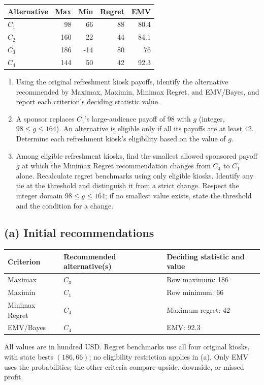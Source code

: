 \begin{center}\small\setlength{\tabcolsep}{4pt}
	\begin{tabular}{lrrrr}\toprule
		Alternative & Max & Min & Regret & EMV\\ \midrule
				$C_1$ & 98 & 66 & 88 & 80.4\\
		$C_2$ & 160 & 22 & 44 & 84.1\\
		$C_3$ & 186 & -14 & 80 & 76\\
		$C_4$ & 144 & 50 & 42 & 92.3\\
		\bottomrule
	\end{tabular}
\end{center}

\begin{enumerate}[label=\textbf{(\alph*)},leftmargin=*]
	\item Using the original refreshment kiosk payoffs, identify the alternative recommended by Maximax, Maximin, Minimax Regret, and EMV/Bayes, and report each criterion's deciding statistic value. 

	\item A sponsor replaces $C_1$'s large-audience payoff of 98 with $g$ (integer, $98\leq g\leq164$). An alternative is eligible only if all its payoffs are at least 42. Determine each refreshment kiosk's eligibility based on the value of $g$. 

	\item Among eligible refreshment kiosks, find the smallest allowed sponsored payoff $g$ at which the Minimax Regret recommendation changes from $C_4$ to $C_1$ alone. Recalculate regret benchmarks using only eligible kiosks. Identify any tie at the threshold and distinguish it from a strict change. Respect the integer domain $98\leq g\leq164$; if no smallest value exists, state the threshold and the condition for a change. 
\end{enumerate}
\label{sol:q2a}
\subsection*{(a) Initial recommendations }
\begin{center}
\begin{tabular}{lll}\toprule
Criterion & Recommended alternative(s) & Deciding statistic and value\\ \midrule
		Maximax & $C_3$ & Row maximum: 186\\
		Maximin & $C_1$ & Row minimum: 66\\
		Minimax Regret & $C_4$ & Maximum regret: 42\\
		EMV/Bayes & $C_4$ & EMV: 92.3\\
		\bottomrule\end{tabular}
\end{center}
All values are in hundred USD. Regret benchmarks use all four original kiosks, with state bests $(186,66)$; no eligibility restriction applies in (a). Only EMV uses the probabilities; the other criteria compare upside, downside, or missed profit.
\secInicio[sec:q2]



